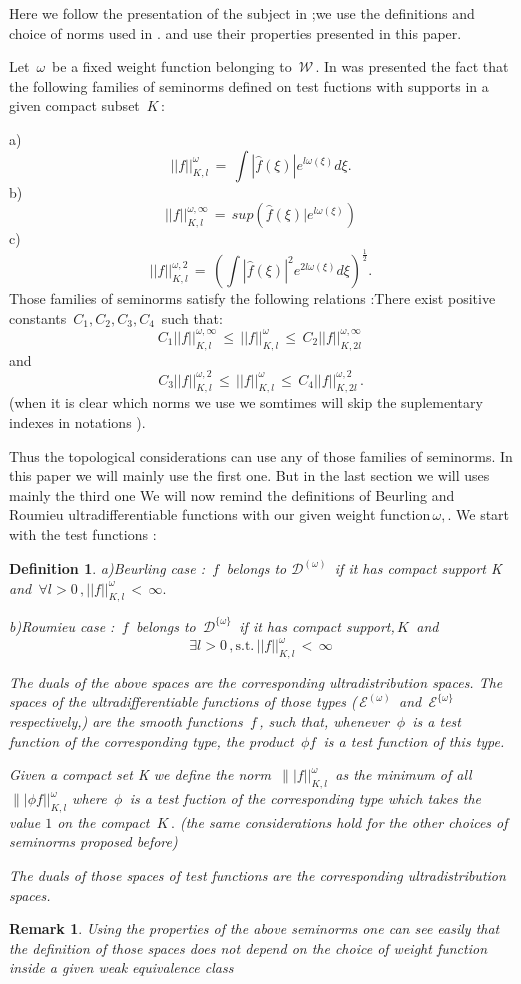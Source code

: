 \documentclass[12pt,a4paper]{amsart}
\newtheorem{definition}[theorem]{Definition}
\newtheorem{remark}[theorem]{Remark}
\begin{document}
Here we follow the presentation of the subject in \cite{D.V.V.};we use the definitions and choice of norms used in
 \cite{D.V.V.}. and use their properties presented in this paper.
 
  Let $\,\omega\,$ be  a fixed weight function belonging to $\,\mathcal{W}\,.$ In \cite{D.V.V.} was presented the fact that the following families of seminorms defined on test fuctions with supports in a given compact subset $\,K\,$:
  
  
  a)$$ ||f||_{K,l}^{\omega} \,
  =\,\int |\hat{f}(\xi)|e^{l\omega(\xi)}d\xi .$$
  b)$$||f||_{K,l}^{\omega,\infty}\,
  =\,sup(\hat{f}(\xi)|e^{l\omega(\xi)})$$
  c) $$||f||_{K,l}^{\omega,2} \,=\,
  (\int|\hat{f}(\xi)|^2e^{2l\omega(\xi)}d\xi)^{\frac{1}{2}} .$$
  Those families of seminorms
 satisfy the following relations :There exist positive constants 
 $\,C_1,C_2,C_3,C_4\,$ such that:
 $$C_1||f||_{K,l}^{\omega,\infty} \,\leq\,||f||_{K,l}^{\omega}\,\leq\,C_2||f||_{K,2l}^{\omega,\infty} \,$$ and
 $$C_3||f||_{K,l}^{\omega,2}\,\leq \,
 ||f||_{K,l}^{\omega} \,\leq\,C_4||f||_{K,2l}^{\omega,2}\,.$$
 (when it is clear which norms we use we somtimes will skip the suplementary indexes in notations ).
 
 Thus the topological considerations can use any of those families of seminorms. 
 In this paper we will mainly use the first one. But in the last section we will uses mainly the third one 
 We will now remind the definitions of Beurling and Roumieu ultradifferentiable functions with our given weight function$\,\omega,$. We start with the test functions :
 \begin{definition}
a)Beurling case :
$ \,f\,$ belongs to $ \mathcal{D}^{(\omega)}\,$ if it has compact support K and 
$\,\forall l>0\,, ||f||_{K,l}^\omega \,< \,\infty.$
 
b)Roumieu case  :
$ \,f\,$ belongs to $ \,\mathcal{D}^{\{\omega\}}\,$ if it has compact support,$\,K\,$ and 
$$\,\exists l>0\,,\mbox{s.t.}\,
||f||_{K,l}^\omega \,<\,\infty \,$$

 
 The duals of the above spaces are the corresponding ultradistribution spaces.
 The spaces of the ultradifferentiable functions of those types ($\,\mathcal{E}^{(\omega)}\,$ and
  $\,\mathcal{E}^{\{\omega\}}\,$ respectively,) are the smooth functions $\,f\,$, such that, whenever 
 $\,\phi\,$  is a test function of the corresponding type, the product $\,\phi f\,$ is a test function of this type.
 
 Given a compact set K we define the norm 
 $\,\||f||_{K,l}^\omega\,$ as the minimum of 
 all $\||\phi f||_{K,l}^\omega $ where $\,\phi\,$ is a test fuction of the corresponding type which takes the value $1$ on the compact $\,K\,.$ (the same considerations hold for the other choices of seminorms proposed before)
 
 The duals of those spaces of test functions are the corresponding ultradistribution spaces.
 \end{definition}
 \begin{remark}
 Using the properties of the above seminorms one can see easily that the definition of those spaces does not depend on the choice of weight function inside a given weak equivalence class
 \end{remark}
 
\end{document}
